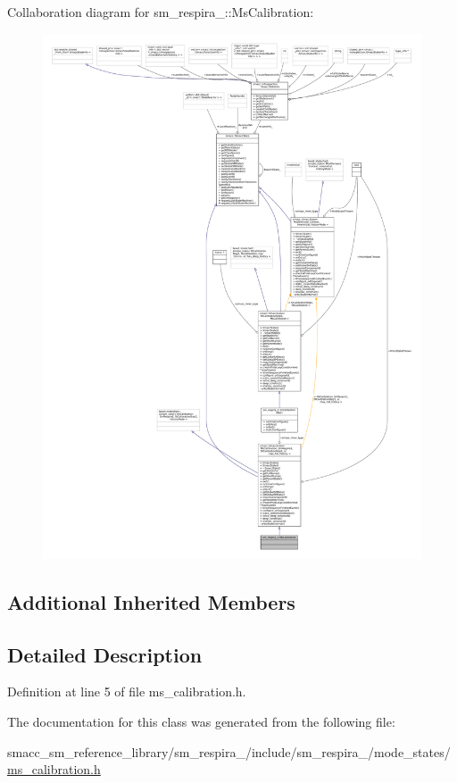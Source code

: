 Collaboration diagram for sm\+\_\+respira\+\_\+:\+:Ms\+Calibration\+:
\nopagebreak
\begin{figure}[H]
\begin{center}
\leavevmode
\includegraphics[width=350pt]{classsm__respira__1_1_1MsCalibration__coll__graph}
\end{center}
\end{figure}
\subsection*{Additional Inherited Members}


\subsection{Detailed Description}


Definition at line 5 of file ms\+\_\+calibration.\+h.



The documentation for this class was generated from the following file\+:\begin{DoxyCompactItemize}
\item 
smacc\+\_\+sm\+\_\+reference\+\_\+library/sm\+\_\+respira\+\_/include/sm\+\_\+respira\+\_/mode\+\_\+states/\hyperlink{ms__calibration_8h}{ms\+\_\+calibration.\+h}\end{DoxyCompactItemize}
